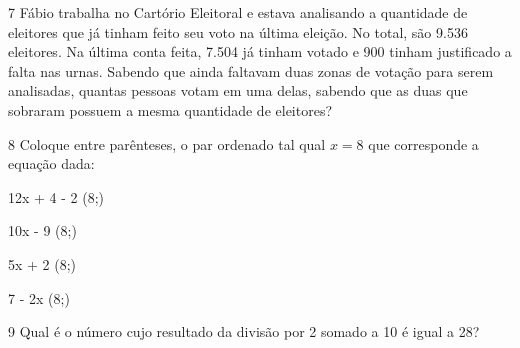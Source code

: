 
\num{7} Fábio trabalha no Cartório Eleitoral e estava analisando a quantidade
de eleitores que já tinham feito seu voto na última eleição. No total,
são 9.536 eleitores. Na última conta feita, 7.504 já tinham votado e 900
tinham justificado a falta nas urnas. Sabendo que ainda faltavam duas
zonas de votação para serem analisadas, quantas pessoas votam em uma
delas, sabendo que as duas que sobraram possuem a mesma quantidade de
eleitores?


\num{8} Coloque entre parênteses, o par ordenado tal qual $x = 8$ que
corresponde a equação dada:
\begin{multicols}{2}
\begin{escolha}[itemsep=10pt]
\item 12x + 4 - 2 (8;) 
\item 10x - 9 (8;) 
\item 5x + 2 (8;) 
\item 7 - 2x (8;) 
\end{escolha}
\end{multicols}

\num{9} Qual é o número cujo resultado da divisão por 2 somado a 10 é igual
a 28?

